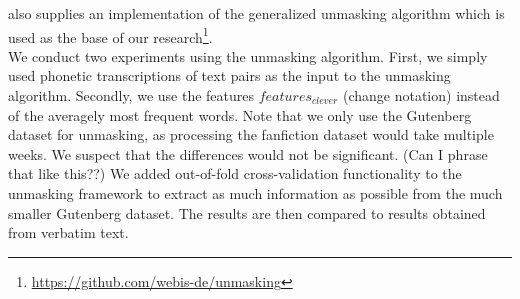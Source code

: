 \cite{bevendorff2019unmaskingShortTexts} also supplies an implementation of the generalized unmasking algorithm which is used as the base of our research\footnote{\url{https://github.com/webis-de/unmasking}}.\\
We conduct two experiments using the unmasking algorithm.
First, we simply used phonetic transcriptions of text pairs as the input to the unmasking algorithm.
Secondly, we use the features $features_{clever}$ (change notation) instead of the averagely most frequent words.
Note that we only use the Gutenberg dataset for unmasking, as processing the fanfiction dataset would take multiple weeks.
We suspect that the differences would not be significant. (Can I phrase that like this??)
We added out-of-fold cross-validation functionality to the unmasking framework to extract as much information as possible from the much smaller Gutenberg dataset.
The results are then compared to results obtained from verbatim text.


%
%

